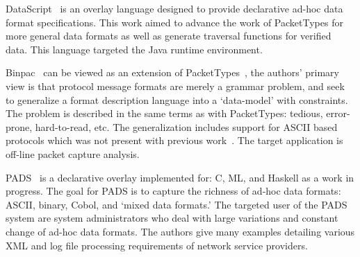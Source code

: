 DataScript~\cite{datascript} is an overlay language designed to provide
declarative ad-hoc data format specifications. This work aimed to advance the
work of PacketTypes for more general data formats as well as generate
traversal functions for verified data. This language targeted the Java
runtime environment.

Binpac~\cite{binpac} can be viewed as an extension of
PacketTypes~\cite{packet_types}, the authors' primary view is that
protocol message formats are merely a grammar problem, and seek
to generalize a format description language into a `data-model' with
constraints. The problem is described in the same terms as with PacketTypes:
tedious, error-prone, hard-to-read, etc. The generalization includes support for
ASCII based protocols which was not present with previous
work~\cite{packet_types}. The target application is off-line packet capture
analysis.

PADS~\cite{pads_orig} is a declarative overlay implemented for: C, ML, and
Haskell as a work in progress. The goal for PADS is to capture the richness
of ad-hoc data formats: ASCII, binary, Cobol, and `mixed data formats.' The
targeted user of the PADS system are system administrators who deal with large
variations and constant change of ad-hoc data formats. The authors give many
examples detailing various XML and log file processing requirements of network
service providers.


